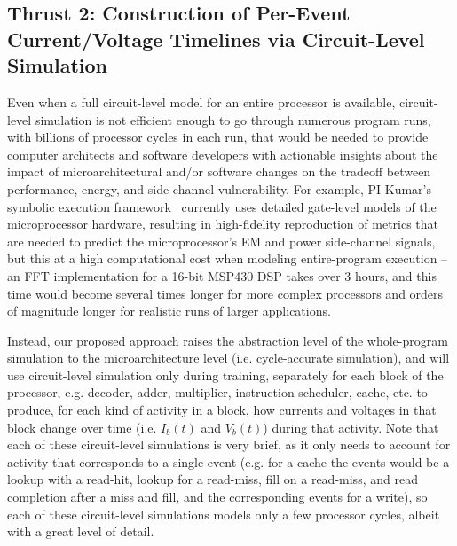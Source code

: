 \subsection{Thrust 2: Construction of Per-Event Current/Voltage Timelines via Circuit-Level Simulation}

Even when a full circuit-level model for an entire processor is available, circuit-level simulation is not efficient enough to go through numerous program runs, with billions of processor cycles in each run, that would be needed to provide computer architects and software developers with actionable insights about the impact of microarchitectural and/or software changes on the tradeoff between performance, energy, and side-channel vulnerability. For example, PI Kumar's symbolic execution framework~\cite{cherupalli2017} currently uses detailed gate-level models of the microprocessor hardware, resulting in high-fidelity reproduction of metrics that are needed to predict the microprocessor's EM and power side-channel signals, but this  at a high computational cost when modeling entire-program execution -- an FFT implementation for a 16-bit MSP430 DSP takes over 3 hours, and this time would become several times longer for more complex processors and orders of magnitude longer for realistic runs of larger applications.

Instead, our proposed approach raises the abstraction level of the whole-program simulation to the microarchitecture level (i.e. cycle-accurate simulation), and will use circuit-level simulation only during training, separately for each block of the processor, e.g. decoder, adder, multiplier, instruction scheduler, cache, etc. to produce, for each kind of activity in a block, how currents and voltages in that block change over time (i.e. $I_b(t)$ and $V_b(t)$) during that activity. Note that each of these circuit-level simulations is very brief, as it only needs to account for activity that corresponds to a single event (e.g. for a cache the events would be a lookup with a read-hit, lookup for a read-miss, fill on a read-miss, and read completion after a miss and fill, and the corresponding events for a write), so each of these circuit-level simulations models only a few processor cycles, albeit with a great level of detail.

